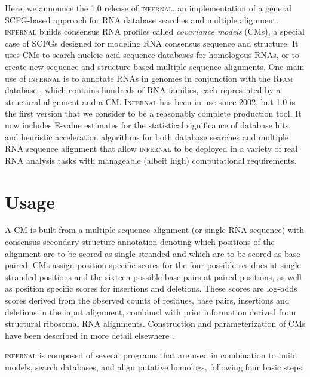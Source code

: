 \documentclass[11pt]{article}
\begin{document}
Here, we announce the 1.0 release of \textsc{infernal}, an
implementation of a general SCFG-based approach for RNA database
searches and multiple alignment. \textsc{infernal} builds consensus
RNA profiles called \emph{covariance models} (CMs), a special case of
SCFGs designed for modeling RNA consensus sequence and structure. It
uses CMs to search nucleic acid sequence databases for homologous
RNAs, or to create new sequence and structure-based multiple sequence
alignments. One main use of \textsc{infernal} is to annotate RNAs in
genomes in conjunction with the \textsc{Rfam} database
\citep{Griffiths-Jones05}, which contains hundreds of RNA families,
each represented by a structural alignment and a CM. \textsc{Infernal}
has been in use since 2002, but 1.0 is the first version that we
consider to be a reasonably complete production tool. It now includes
E-value estimates for the statistical significance of database hits,
and heuristic acceleration algorithms for both database searches and
multiple RNA sequence alignment that allow \textsc{infernal} to be
deployed in a variety of real RNA analysis tasks with manageable
(albeit high) computational requirements.

\section{Usage} 

A CM is built from a multiple sequence alignment (or single RNA
sequence) with consensus secondary structure annotation denoting which
positions of the alignment are to be scored as single stranded and
which are to be scored as base paired. CMs assign position specific
scores for the four possible residues at single stranded positions and
the sixteen possible base pairs at paired positions, as well as
position specific scores for insertions and deletions. These scores
are log-odds scores derived from the observed counts of residues, base
pairs, insertions and deletions in the input alignment, combined with
prior information derived from structural ribosomal RNA
alignments. Construction and parameterization of CMs have been
described in more detail elsewhere
\citep{Eddy94,infguide03,Eddy02b,NawrockiEddy07}.

\textsc{infernal} is composed of several programs that are used in
combination to build models, search databases, and align putative
homologs, following four basic steps:
\end{document}
